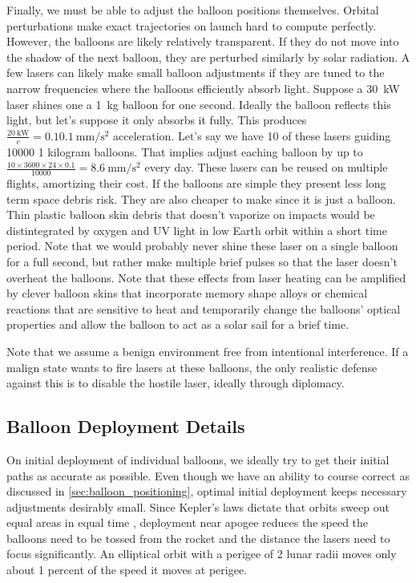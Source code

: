 \documentclass{article}
\begin{document}
Finally, we must be able to adjust the balloon positions themselves.   Orbital perturbations make exact trajectories on launch hard to compute perfectly.    However, the balloons are likely relatively transparent.   If they do not move into the shadow of the next balloon, they are perturbed similarly by solar radiation.    A few lasers can likely make small balloon adjustments if they are tuned to the narrow frequencies where the balloons efficiently absorb light.    Suppose a \SI{30}{\kilo\watt} laser shines one a \SI{1}{\kilo\gram} balloon for one second.   Ideally the balloon reflects this light, but let's suppose it only absorbs it fully.   This produces \(\frac{ \SI{20}{\kilo\watt}}{c}=0.1 \SI{0.1}{\milli\metre\per\square\second}\) acceleration.   Let's say we have 10 of these lasers guiding 10000 1 kilogram balloons.   That implies adjust eaching balloon by up to \(\frac{10 \times 3600\times 24\times0.1}{10000}=\SI{8.6} {\milli\meter\per\square\second}\) every day.   These lasers can be reused on multiple flights, amortizing their cost.   If the balloons are simple they present less long term space debris risk.   They are also cheaper to make since it is just a balloon.   Thin plastic balloon skin debris that doesn't vaporize on impacts would be distintegrated by oxygen and UV light in low Earth orbit within a short time period.  Note that we would probably never shine these laser on a single balloon for a full second, but rather make multiple brief pulses so that the laser doesn't overheat the balloons.   Note that these effects from laser heating can be amplified by clever balloon skins that incorporate memory shape alloys or chemical reactions that are sensitive to heat and temporarily change the balloons' optical properties and allow the balloon to act as a solar sail for a brief time.  

Note that we assume a benign environment free from intentional interference.   If a malign state wants to fire lasers at these balloons, the only realistic defense against this is to disable the hostile laser, ideally through diplomacy.

\subsection{Balloon Deployment Details}\label{sec:balloon_deployment}
On initial deployment of individual balloons, we ideally try to get their initial paths as accurate as possible.   Even though we have an ability to course correct as discussed in \autoref{sec:balloon_positioning}, optimal initial deployment keeps necessary adjustments desirably small.   Since Kepler's laws dictate that orbits sweep out equal areas in equal time \cite{keplers_laws}, deployment near apogee reduces the speed the balloons need to be tossed from the rocket and the distance the lasers need to focus significantly.      An elliptical orbit with a perigee of 2 lunar radii moves only about 1 percent of the speed it moves at perigee.   
\end{document}

